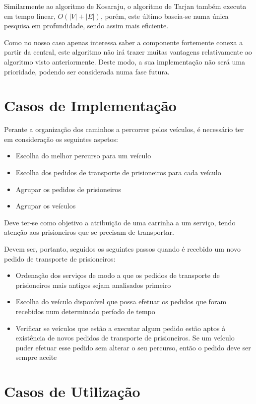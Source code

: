 \documentclass[article, a4paper, 12pt, oneside]{memoir}
\begin{document}
Similarmente ao algoritmo de Kosaraju, o algoritmo de Tarjan também executa em tempo linear, $O(|V| + |E|)$, porém, este último baseia-se numa única pesquisa em profundidade, sendo assim mais eficiente.

Como no nosso caso apenas interessa saber a componente fortemente conexa a partir da central, este algoritmo não irá trazer muitas vantagens relativamente ao algoritmo visto anteriormente. Deste modo, a sua implementação não será uma prioridade, podendo ser considerada numa fase futura.

\newpage
\section{Casos de Implementação}
Perante a organização dos caminhos a percorrer pelos veículos, é necessário ter em consideração os seguintes aspetos:

\begin{itemize}
	\item Escolha do melhor percurso para um veículo
	\item Escolha dos pedidos de transporte de prisioneiros para cada veículo
	\item Agrupar os pedidos de prisioneiros
	\item Agrupar os veículos
\end{itemize}

Deve ter-se como objetivo a atribuição de uma carrinha a um serviço, tendo atenção aos prisioneiros que se precisam de transportar.

Devem ser, portanto, seguidos os seguintes passos quando é recebido um novo pedido de transporte de prisioneiros:

\begin{itemize}
	\item Ordenação dos serviços de modo a que os pedidos de transporte de prisioneiros mais antigos sejam analisados primeiro
	\item Escolha do veículo disponível que possa efetuar os pedidos que foram recebidos num determinado período de tempo
	\item Verificar se veículos que estão a executar algum pedido estão aptos à existência de novos pedidos de transporte de prisioneiros. Se um veículo puder efetuar esse pedido sem alterar o seu percurso, então o pedido deve ser sempre aceite
\end{itemize}

\newpage
\section{Casos de Utilização}
\end{document}
